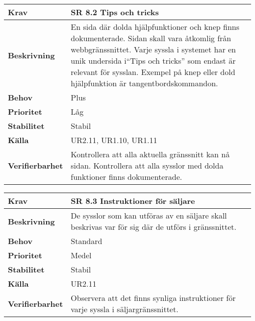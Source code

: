 \documentclass[a4paper, twoside, 11pt, titlepage]{article}
\begin{document}
	\begin{tabular} { p{2.6cm} p{12.5cm} }
		\hline
		\sffamily\textbf{Krav} & \sffamily\textbf{SR 8.2 Tips och tricks } \\
		\hline
		\sffamily\textbf{Beskrivning} & En sida där dolda hjälpfunktioner och knep finns dokumenterade. Sidan skall vara åtkomlig från webbgränssnittet. Varje syssla i systemet har en unik undersida i``Tips och tricks'' som endast är relevant för sysslan. Exempel på knep eller dold hjälpfunktion är tangentbordskommandon.  \\
		\hline
		\sffamily\textbf{Behov} & Plus  \\
		\hline
		\sffamily\textbf{Prioritet} & Låg  \\
		\hline
		\sffamily\textbf{Stabilitet} & Stabil  \\
		\hline
		\sffamily\textbf{Källa} & UR2.11, UR1.10, UR1.11  \\
		\hline
		\sffamily\textbf{Verifierbarhet} & Kontrollera att alla aktuella gränssnitt kan nå sidan. Kontrollera att alla sysslor med dolda funktioner finns dokumenterade.  \\
		\hline
	\end{tabular}
	\vspace{6mm}

	\begin{tabular} { p{2.6cm} p{12.5cm} }
		\hline
		\sffamily\textbf{Krav} & \sffamily\textbf{SR 8.3 Instruktioner för säljare } \\
		\hline
		\sffamily\textbf{Beskrivning} & De sysslor som kan utföras av en säljare skall beskrivas var för sig där de utförs i gränssnittet.  \\
		\hline
		\sffamily\textbf{Behov} & Standard  \\
		\hline
		\sffamily\textbf{Prioritet} & Medel  \\
		\hline
		\sffamily\textbf{Stabilitet} & Stabil  \\
		\hline
		\sffamily\textbf{Källa} & UR2.11  \\
		\hline
		\sffamily\textbf{Verifierbarhet} & Observera att det finns synliga instruktioner för varje syssla i säljargränssnittet.  \\
		\hline
	\end{tabular}
	\vspace{6mm}
\end{document}
